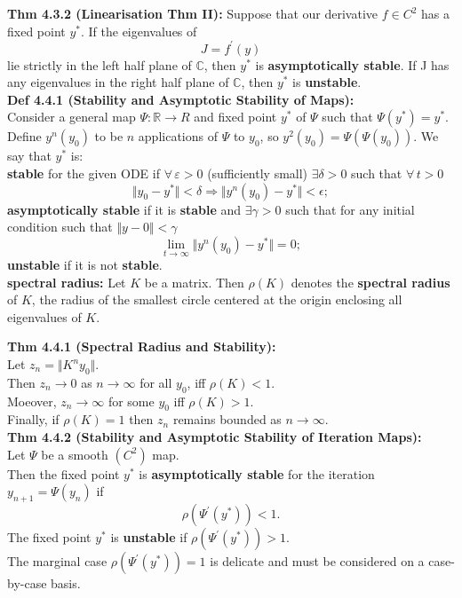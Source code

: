 \documentclass[10pt,a4paper]{article}
\newcommand{\R}{\mathbb{R}}
\newcommand{\C}{\mathbb{C}}
\renewcommand{\implies}{\Rightarrow}
\begin{document}
\begin{multicols*}{2}
\textbf{Thm 4.3.2 (Linearisation Thm II):} Suppose that our derivative $f \in C^2$ has a fixed point $y^*$. If the eigenvalues of 
\[
J = f^\prime(y)    
\]
lie strictly in the left half plane of $\C$, then $y^*$ is \textbf{asymptotically stable}. If J has any eigenvalues in the right half plane of $\C$, then $y^*$ is \textbf{unstable}.\\

\textbf{Def 4.4.1 (Stability and Asymptotic Stability of Maps):}\\
Consider a general map $\Psi : \R \to R$ and fixed point $y^*$ of $\Psi$ such that $\Psi(y^*) = y^*$. Define $y^n(y_0)$ to be $n$ applications of $\Psi$ to $y_0$, so $y^2(y_0) = \Psi(\Psi(y_0))$. We say that $y^*$ is:\\
\textbf{stable} for the given ODE if $\forall \, \varepsilon > 0$ (sufficiently small) $\exists \delta > 0$ such that $\forall \, t > 0$
\[
    \Vert y_0 - y^*\Vert  < \delta \implies \Vert y^n(y_0) - y^* \Vert < \epsilon;
\]
\textbf{asymptotically stable} if it is \textbf{stable} and $\exists \gamma > 0 $ such that for any initial condition such that $\Vert y-0 \Vert < \gamma$ 
\[
    \lim_{t \to \infty} \Vert y^n(y_0) - y^* \Vert = 0;
\]
\textbf{unstable} if it is not \textbf{stable}.\\

\textbf{spectral radius:} Let $K$ be a matrix. Then $\rho(K)$ denotes the \textbf{spectral radius} of $K$, the radius of the smallest circle centered at the origin enclosing all eigenvalues of $K$.

\textbf{Thm 4.4.1 (Spectral Radius and Stability):}\\
Let $z_n = \Vert K^ny_0 \Vert$.\\
Then $z_n \to 0$ as $n \to \infty$ for all $y_0$, iff $\rho(K) < 1$.\\
Moeover, $z_n \to \infty$ for some $y_0$ iff $\rho(K) > 1$.\\
Finally, if $\rho(K) = 1$ then $z_n$ remains bounded as $n \to \infty$.\\

\textbf{Thm 4.4.2 (Stability and Asymptotic Stability of Iteration Maps):} \\
Let $\Psi$ be a smooth $(C^2)$ map.\\
Then the fixed point $y^*$ is \textbf{asymptotically stable} for the iteration $y_{n+1} = \Psi(y_n)$ if 
\[
    \rho(\Psi^\prime(y^*)) < 1.
\] 
The fixed point $y^*$ is \textbf{unstable} if $\rho(\Psi^\prime(y^*)) > 1$.\\
The marginal case $\rho(\Psi^\prime(y^*)) = 1$ is delicate and must be considered on a case-by-case basis.\\


\end{multicols*}
\end{document}
